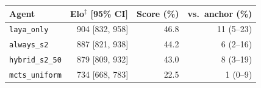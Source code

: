 \footnotesize\setlength{\tabcolsep}{3pt}\begin{tabular}{lrrr}
\toprule
Agent & Elo$^{\ddagger}$ [95\% CI] & Score (\%) & vs.\ anchor (\%) \\
\midrule
\texttt{laya\_only} & 904 [832, 958] & 46.8 & 11 (5--23) \\
\texttt{always\_s2} & 887 [821, 938] & 44.2 & 6 (2--16) \\
\texttt{hybrid\_s2\_50} & 879 [809, 932] & 43.0 & 8 (3--19) \\
\texttt{mcts\_uniform} & 734 [668, 783] & 22.5 & 1 (0--9) \\
\bottomrule
\end{tabular}

